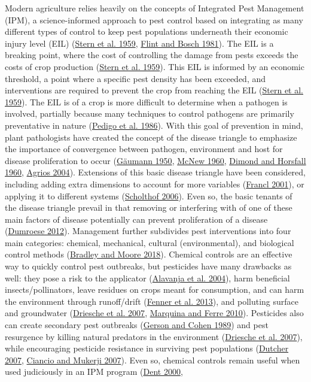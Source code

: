 \documentclass{ufdissertation}[overrideChapters] %
\begin{document}
{Modern agriculture relies heavily on the concepts of Integrated Pest Management (IPM), a science-informed approach to pest control based on integrating as many different types of control to keep pest populations underneath their economic injury level (EIL) (\protect\hyperlink{ref-Stern1959}{Stern et al. 1959}, \protect\hyperlink{ref-Flint1981}{Flint and Bosch 1981}). The EIL is a breaking point, where the cost of controlling the damage from pests exceeds the costs of crop production (\protect\hyperlink{ref-Stern1959}{Stern et al. 1959}). This EIL is informed by an economic threshold, a point where a specific pest density has been exceeded, and interventions are required to prevent the crop from reaching the EIL (\protect\hyperlink{ref-Stern1959}{Stern et al. 1959}). The EIL is of a crop is more difficult to determine when a pathogen is involved, partially because many techniques to control pathogens are primarily preventative in nature (\protect\hyperlink{ref-Pedigo1986}{Pedigo et al. 1986}). With this goal of prevention in mind, plant pathologists have created the concept of the disease triangle to emphasize the importance of convergence between pathogen, environment and host for disease proliferation to occur (\protect\hyperlink{ref-Gaeumann1950}{Gäumann 1950}, \protect\hyperlink{ref-McNew1960}{McNew 1960}, \protect\hyperlink{ref-Stevens1960}{Dimond and Horsfall 1960}, \protect\hyperlink{ref-Agrios2004}{Agrios 2004}). Extensions of this basic disease triangle have been considered, including adding extra dimensions to account for more variables (\protect\hyperlink{ref-Francl2001}{Francl 2001}), or applying it to different systems (\protect\hyperlink{ref-Scholthof2006}{Scholthof 2006}). Even so, the basic tenants of the disease triangle prevail in that removing or interfering with of one of these main factors of disease potentially can prevent proliferation of a disease (\protect\hyperlink{ref-Dumroese2012}{Dumroese 2012}). Management further subdivides pest interventions into four main categories: chemical, mechanical, cultural (environmental), and biological control methods (\protect\hyperlink{ref-Bradley2018}{Bradley and Moore 2018}). Chemical controls are an effective way to quickly control pest outbreaks, but pesticides have many drawbacks as well: they pose a risk to the applicator (\protect\hyperlink{ref-Alavanja2004}{Alavanja et al. 2004}), harm beneficial insects/pollinators, leave residues on crops meant for consumption, and can harm the environment through runoff/drift (\protect\hyperlink{ref-Fenner2013}{Fenner et al. 2013}), and polluting surface and groundwater (\protect\hyperlink{ref-Driesche2007}{Driesche et al. 2007}, \protect\hyperlink{ref-Marquina2010}{Marquina and Ferre 2010}). Pesticides also can create secondary pest outbreaks (\protect\hyperlink{ref-Gerson1989}{Gerson and Cohen 1989}) and pest resurgence by killing natural predators in the environment (\protect\hyperlink{ref-Driesche2007}{Driesche et al. 2007}), while encouraging pesticide resistance in surviving pest populations (\protect\hyperlink{ref-Dutcher2007}{Dutcher 2007}, \protect\hyperlink{ref-Ciancio2007}{Ciancio and Mukerji 2007}). Even so, chemical controls remain useful when used judiciously in an IPM program (\protect\hyperlink{ref-Dent2000}{Dent 2000}, }
\end{document}
